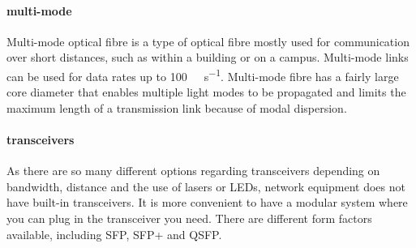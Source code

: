 \paragraph{multi-mode}
Multi-mode optical fibre is a type of optical fibre mostly used for communication over short distances, such as within a building or on a campus.
Multi-mode links can be used for data rates up to \SI{100}{\giga\bit\per\second}.
Multi-mode fibre has a fairly large core diameter that enables multiple light modes to be propagated and limits the maximum length of a transmission link because of modal dispersion.

\paragraph{transceivers}
As there are so many different options regarding transceivers depending on bandwidth, distance and the use of lasers or \acsp{LED}, network equipment does not have built-in transceivers.
It is more convenient to have a modular system where you can plug in the transceiver you need.
There are different form factors available, including \acs{SFP}, \acs{SFP+} and \acs{QSFP}.

